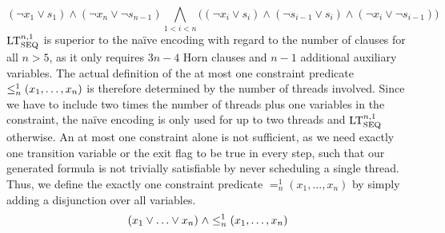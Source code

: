 \[
  (\neg x_1 \lor s_1) \land (\neg x_n \lor \neg s_{n-1}) \bigwedge_{1 < i < n} \big ( (\neg x_i \lor s_i) \land (\neg s_{i-1} \lor s_i) \land (\neg x_i \lor \neg s_{i-1}) \big )
\]
$\text{LT}^{n, 1}_{\text{SEQ}}$ is superior to the na\"ive encoding with regard to the number of clauses for all $n > 5$, as it only requires $3n - 4$ Horn clauses and $n - 1$ additional auxiliary variables.
The actual definition of the at most one constraint predicate $\leq^1_n(x_1, \ldots, x_n)$ is therefore determined by the number of threads involved.
Since we have to include two times the number of threads plus one variables in the constraint, the na\"ive encoding is only used for up to two threads and $\text{LT}^{n, 1}_{\text{SEQ}}$ otherwise.
An at most one constraint alone is not sufficient, as we need exactly one transition variable or the exit flag to be true in every step, such that our generated formula is not trivially satisfiable by never scheduling a single thread.
Thus, we define the exactly one constraint predicate $=^1_n\!(x_1, \ldots, x_n)$ by simply adding a disjunction over all variables.%
\[
  (x_1 \lor \ldots \lor x_n) \; \land \leq^1_n(x_1, \ldots, x_n)
\]
